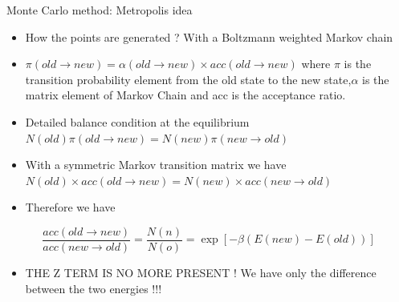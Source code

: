 \documentclass{beamer}
\begin{document}
\begin{frame}{Monte Carlo method: Metropolis idea \cite{frenkel2001understanding}}

\begin{itemize}

\item How the points are generated ? With a Boltzmann weighted Markov chain
\item $\pi(old \rightarrow new) = \alpha (old \rightarrow new) \times acc(old \rightarrow new) $ where $\pi$ is the transition probability element from the old state to the new state,$\alpha$ is the matrix element of Markov Chain and acc is the acceptance ratio. 
\item Detailed balance condition at the equilibrium $N(old)\pi(old \rightarrow new)= N(new)\pi(new \rightarrow old) $ 
\item With a symmetric Markov transition matrix we have $N(old)\times acc(old\rightarrow new) = N(new) \times acc(new\rightarrow old)$
\item Therefore we have 
\end{itemize}

\begin{equation}
\frac{acc(old \rightarrow new)}{acc(new \rightarrow old)}=\dfrac{N(n)}{N(o)}=\exp\left[ -\beta \left( E(new)-E(old) \right) \right]
\end{equation}
\begin{itemize}
\item THE Z TERM IS NO MORE PRESENT ! We have only the difference between the two energies !!!
\end{itemize}


\end{frame}
\end{document}
